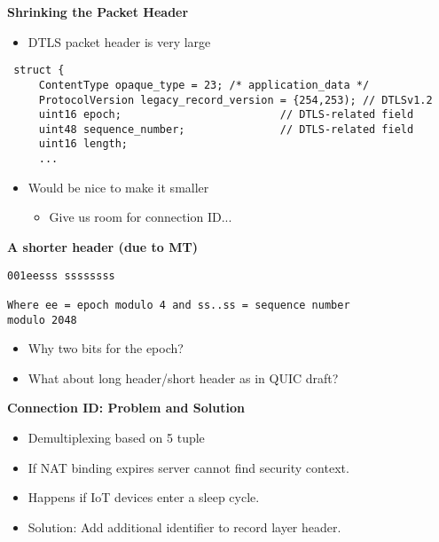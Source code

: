 \documentclass[helvetica]{seminar}
\newcommand{\heading}[1]{%
  \begin{center} 
    \large\bf 
    #1 
  \end{center} 
  \vspace{.4 in}}
\begin{document}
\begin{slide}
\heading{Shrinking the Packet Header}

\begin{itemize}
\item DTLS packet header is very large
\end{itemize}

{\small
\begin{verbatim}
 struct {
     ContentType opaque_type = 23; /* application_data */
     ProtocolVersion legacy_record_version = {254,253); // DTLSv1.2
     uint16 epoch;                         // DTLS-related field
     uint48 sequence_number;               // DTLS-related field
     uint16 length;
     ...
\end{verbatim}
}

\begin{itemize}
\item Would be nice to make it smaller
  \begin{itemize}
  \item Give us room for connection ID...
  \end{itemize}
\end{itemize}

\end{slide}

\begin{slide}
\heading{A shorter header (due to MT)}

\begin{verbatim}
001eesss ssssssss

Where ee = epoch modulo 4 and ss..ss = sequence number
modulo 2048
\end{verbatim}

\begin{itemize}
\item Why two bits for the epoch?
\item What about long header/short header as in QUIC draft?
\end{itemize}

\end{slide}


\begin{slide}
\heading{Connection ID: Problem and Solution}
\begin{itemize} 
\item Demultiplexing based on 5 tuple
\item If NAT binding expires server cannot find security context.
\item Happens if IoT devices enter a sleep cycle.
\item Solution: Add additional identifier to record layer header.
\end{itemize}
\end{slide}
\end{document}
